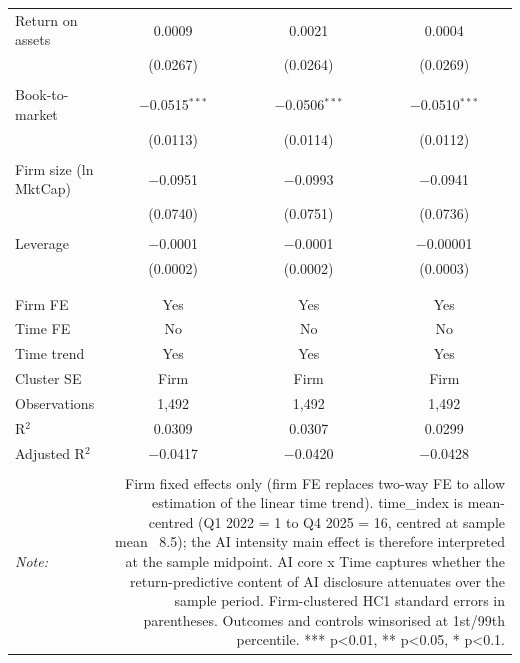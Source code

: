 \begin{table}[!htbp]
\begin{tabular}{@{\extracolsep{5pt}}lccc}
 Return on assets & 0.0009 & 0.0021 & 0.0004 \\ 
  & (0.0267) & (0.0264) & (0.0269) \\ 
  & & & \\ 
 Book-to-market & $-$0.0515$^{***}$ & $-$0.0506$^{***}$ & $-$0.0510$^{***}$ \\ 
  & (0.0113) & (0.0114) & (0.0112) \\ 
  & & & \\ 
 Firm size (ln MktCap) & $-$0.0951 & $-$0.0993 & $-$0.0941 \\ 
  & (0.0740) & (0.0751) & (0.0736) \\ 
  & & & \\ 
 Leverage & $-$0.0001 & $-$0.0001 & $-$0.00001 \\ 
  & (0.0002) & (0.0002) & (0.0003) \\ 
  & & & \\ 
\hline \\[-1.8ex] 
Firm FE & Yes & Yes & Yes \\ 
Time FE & No & No & No \\ 
Time trend & Yes & Yes & Yes \\ 
Cluster SE & Firm & Firm & Firm \\ 
Observations & 1,492 & 1,492 & 1,492 \\ 
R$^{2}$ & 0.0309 & 0.0307 & 0.0299 \\ 
Adjusted R$^{2}$ & $-$0.0417 & $-$0.0420 & $-$0.0428 \\ 
\hline 
\hline \\[-1.8ex] 
\textit{Note:}  & \multicolumn{3}{r}{Firm fixed effects only (firm FE replaces two-way FE to allow estimation of the linear time trend). time_index is mean-centred (Q1 2022 = 1 to Q4 2025 = 16, centred at sample mean ~8.5); the AI intensity main effect is therefore interpreted at the sample midpoint. AI core x Time captures whether the return-predictive content of AI disclosure attenuates over the sample period. Firm-clustered HC1 standard errors in parentheses. Outcomes and controls winsorised at 1st/99th percentile. *** p<0.01, ** p<0.05, * p<0.1.} \\ 
\end{tabular} 
\end{table} 
